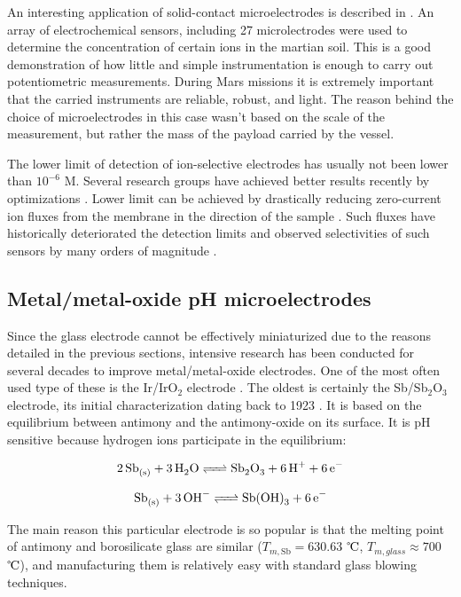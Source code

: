 An interesting application of solid-contact microelectrodes is described in \cite{kounaves2002determination}.
An array of electrochemical sensors, including 27 microlectrodes were used to determine the concentration of certain ions in the martian soil. This is a good demonstration of how little and simple instrumentation is enough to carry out potentiometric measurements. During Mars missions it is extremely important that the carried instruments are reliable, robust, and light. The reason behind the choice of microelectrodes in this case wasn't based on the scale of the measurement, but rather the mass of the payload carried by the vessel.


The lower limit of detection of ion-selective electrodes has usually not been lower than $10^{-6}$ M.
Several research groups have achieved better results recently by optimizations \cite{sodergaard2003lowering}.
Lower limit can be achieved by drastically reducing zero-current ion fluxes from the membrane in the direction of the sample \cite{malon2006potentiometry}.
Such fluxes have historically deteriorated the detection limits and observed selectivities of such sensors by many orders of magnitude \cite{sutter2004solid}.

\subsection{Metal/metal-oxide pH microelectrodes}
Since the glass electrode cannot be effectively miniaturized due to the reasons detailed in the previous sections, intensive research has been conducted for several decades to improve metal/metal-oxide electrodes.
One of the most often used type of these is the Ir/IrO$_2$ electrode \cite{beyenal2004improved}.
The oldest is certainly the Sb/Sb$_2$O$_3$ electrode, its initial characterization dating back to 1923 \cite{uhl1923electrometric}.
It is based on the equilibrium between antimony and the antimony-oxide on its surface.
It is pH sensitive because hydrogen ions participate in the equilibrium:

\begin{equation}
        \ce{2Sb_{(s)} + 3H_2O <=> Sb_2O_3 + 6H^+ + 6e^-}
\end{equation}

\begin{equation}
        \ce{Sb_{(s)} + 3OH^- <=> Sb(OH)_3 + 6e^-}
\end{equation}

The main reason this particular electrode is so popular is that the melting point of antimony and borosilicate glass are similar ($T_{m, \textrm{Sb}} = 630.63$ $\celsius$, $T_{m, glass}\approx 700$ $\celsius$), and manufacturing them is relatively easy with standard glass blowing techniques.

